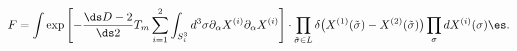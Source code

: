 \begin{equation}
F= \int \exp\left[ - \frac{\ds D-2}{\ds 2} T_m \sum^2 _{i=1} \int_
{S^3_i} d^3 \sigma \partial_\alpha X^{(i)} \partial_\alpha X^{(i)} \right] 
\cdot \prod_{\tilde{\sigma} \in L} \delta \bigl( X^{(1)} (\tilde{\sigma})
- X^{(2)} (\tilde{\sigma}) \bigr) \prod_\sigma dX^{(i)} (\sigma) \es.  
\end{equation}

